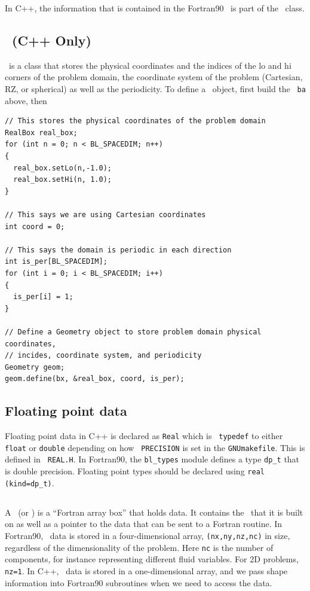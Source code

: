 In C++, the information that is contained in the Fortran90 \layout\ is part of
the \MultiFab\ class.

\subsection{\Geometry\ (C++ Only)}

\Geometry\ is a class that stores the physical coordinates and the indices of the
lo and hi corners of the problem domain, the coordinate system of the problem
(Cartesian, RZ, or spherical) as well as the periodicity.  To define a \Geometry\
object, first build the \BoxArray\ {\tt ba} above, then
\begin{lstlisting}[backgroundcolor=\color{light-blue}]
// This stores the physical coordinates of the problem domain
RealBox real_box;
for (int n = 0; n < BL_SPACEDIM; n++)
{
  real_box.setLo(n,-1.0);
  real_box.setHi(n, 1.0);
}

// This says we are using Cartesian coordinates
int coord = 0;

// This says the domain is periodic in each direction
int is_per[BL_SPACEDIM];
for (int i = 0; i < BL_SPACEDIM; i++)
{
  is_per[i] = 1;
}

// Define a Geometry object to store problem domain physical coordinates,
// incides, coordinate system, and periodicity
Geometry geom;
geom.define(bx, &real_box, coord, is_per);
\end{lstlisting}


\subsection{Floating point data}

Floating point data in C++ is declared as {\tt Real} which is {\tt
typedef} to either {\tt float} or {\tt double} depending on how {\tt
PRECISION} is set in the {\tt GNUmakefile}.  This is defined in {\tt
REAL.H}.  In Fortran90, the {\tt bl\_types} module defines a type {\tt dp\_t} that
is double precision.  Floating point types should be declared using
{\tt real (kind=dp\_t)}.

\subsection{\FArrayBox}

A \FArrayBox\ (or \Fab) is a ``Fortran array box'' that holds data.  It contains the
\BoxType\ that it is built on as well as a pointer to the data 
that can be sent to a Fortran routine.
In Fortran90, \Fab\ data is stored in a four-dimensional array,
{\tt (nx,ny,nz,nc)} in size, regardless of the dimensionality of the
problem.  Here {\tt nc} is the number of components, for instance
representing different fluid variables.  For 2D problems, {\tt nz=1}.
In C++, \Fab\ data is stored in a one-dimensional array, and we pass
shape information into Fortran90 subroutines when we need to access
the data.

